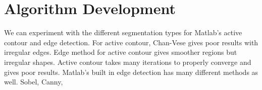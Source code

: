 \documentclass{article}
\begin{document}
\section{Algorithm Development}

We can experiment with the different segmentation types for Matlab's active contour and edge detection. For active contour, Chan-Vese gives poor results with irregular edges. Edge method for active contour gives smoother regions but irregular shapes. Active contour takes many iterations to properly converge and gives poor results. Matlab's built in edge detection has many different methods as well. Sobel, Canny,
\end{document}
